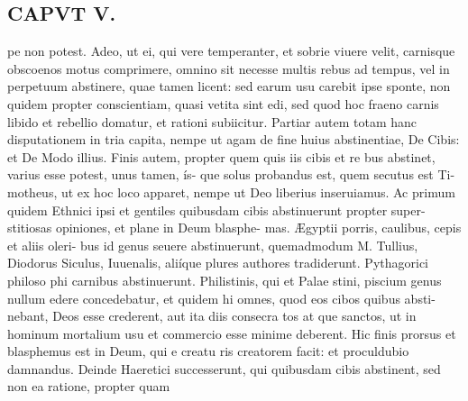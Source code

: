 \documentclass{article}
\begin{document}
\begin{pages}
\section*{CAPVT  V. }
\marginpar{[ p.373 ]}pe non potest. Adeo, ut ei, qui vere temperanter, et sobrie viuere velit, carnisque obscoenos motus comprimere, omnino sit necesse multis rebus ad tempus, vel in perpetuum abstinere, quae tamen licent: sed earum usu carebit ipse sponte, non quidem propter conscientiam, quasi vetita sint edi, sed quod hoc fraeno carnis libido et rebellio domatur, et rationi subiicitur. Partiar autem totam hanc disputationem in tria capita, nempe ut agam de fine huius abstinentiae, De Cibis: et De Modo illius. Finis autem, propter quem quis iis cibis et re bus abstinet, varius esse potest, unus tamen, ís- que solus probandus est, quem secutus est Ti- motheus, ut ex hoc loco apparet, nempe ut Deo liberius inseruiamus. Ac primum quidem Ethnici ipsi et gentiles quibusdam cibis abstinuerunt propter super- stitiosas opiniones, et plane in Deum blasphe- mas. Ægyptii porris, caulibus, cepis et aliis oleri- bus id genus seuere abstinuerunt, quemadmodum M. Tullius, Diodorus Siculus, Iuuenalis, aliíque plures authores tradiderunt. Pythagorici philoso phi carnibus abstinuerunt. Philistinis, qui et Palae stini, piscium genus nullum edere concedebatur, et quidem hi omnes, quod eos cibos quibus absti- nebant, Deos esse crederent, aut ita diis consecra tos at que sanctos, ut in hominum mortalium usu et commercio esse minime deberent. Hic finis prorsus et blasphemus est in Deum, qui e creatu ris creatorem facit: et proculdubio damnandus. Deinde Haeretici successerunt, qui quibusdam cibis abstinent, sed non ea ratione, propter quam 

\end{pages}
\end{document}
